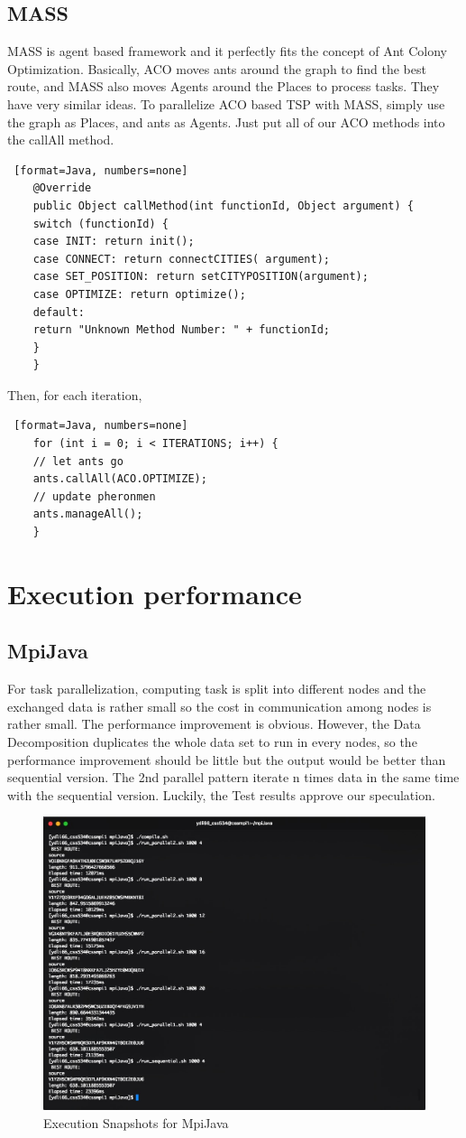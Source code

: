 \documentclass[11pt, letterpaper]{article}
\begin{document}
	\subsection{MASS}
	MASS is agent based framework and it perfectly fits the concept of Ant Colony Optimization. Basically, ACO moves ants around the graph to find the best route, and MASS also moves Agents around the Places to process tasks. They have very similar ideas. To parallelize ACO based TSP with MASS, simply use the graph as Places, and ants as Agents. Just put all of our ACO methods into the callAll method.
	\begin{lstlisting} [format=Java, numbers=none]
	@Override
	public Object callMethod(int functionId, Object argument) {
	switch (functionId) {
	case INIT: return init();
	case CONNECT: return connectCITIES( argument);
	case SET_POSITION: return setCITYPOSITION(argument);
	case OPTIMIZE: return optimize();
	default:
	return "Unknown Method Number: " + functionId;
	}
	}
	\end{lstlisting}
	Then, for each iteration, 
	\begin{lstlisting} [format=Java, numbers=none]
	for (int i = 0; i < ITERATIONS; i++) {
	// let ants go
	ants.callAll(ACO.OPTIMIZE);
	// update pheronmen
	ants.manageAll();
	}
	\end{lstlisting}
	
	
	\section {Execution performance}
	
	\subsection{MpiJava}	
	For task parallelization, computing task is split into different nodes and the exchanged data is rather small so the cost in communication among nodes is rather small. The performance improvement is obvious. However, the Data Decomposition duplicates the whole data set to run in every nodes, so the performance improvement should be little but the output would be better than sequential version. The 2nd parallel pattern iterate n times data in the same time with the sequential version. Luckily, the Test results approve our speculation.
	
	\begin{figure}[H]
		\centering
		\includegraphics[width=0.7\linewidth]{running}
		\caption{Execution Snapshots for MpiJava}
		\label{fig:running}
	\end{figure}
	
\end{document}
